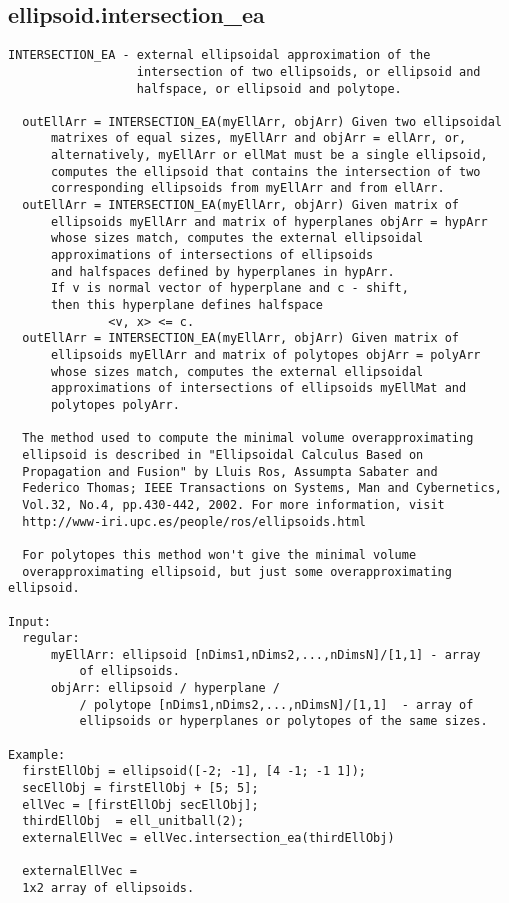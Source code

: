 \subsection{\texorpdfstring{ellipsoid.intersection\_ea}{intersection\_ea}}\label{method:ellipsoid.intersectionea}
\begin{verbatim}
INTERSECTION_EA - external ellipsoidal approximation of the
                  intersection of two ellipsoids, or ellipsoid and
                  halfspace, or ellipsoid and polytope.

  outEllArr = INTERSECTION_EA(myEllArr, objArr) Given two ellipsoidal
      matrixes of equal sizes, myEllArr and objArr = ellArr, or,
      alternatively, myEllArr or ellMat must be a single ellipsoid,
      computes the ellipsoid that contains the intersection of two
      corresponding ellipsoids from myEllArr and from ellArr.
  outEllArr = INTERSECTION_EA(myEllArr, objArr) Given matrix of
      ellipsoids myEllArr and matrix of hyperplanes objArr = hypArr
      whose sizes match, computes the external ellipsoidal
      approximations of intersections of ellipsoids
      and halfspaces defined by hyperplanes in hypArr.
      If v is normal vector of hyperplane and c - shift,
      then this hyperplane defines halfspace
              <v, x> <= c.
  outEllArr = INTERSECTION_EA(myEllArr, objArr) Given matrix of
      ellipsoids myEllArr and matrix of polytopes objArr = polyArr
      whose sizes match, computes the external ellipsoidal
      approximations of intersections of ellipsoids myEllMat and
      polytopes polyArr.

  The method used to compute the minimal volume overapproximating
  ellipsoid is described in "Ellipsoidal Calculus Based on
  Propagation and Fusion" by Lluis Ros, Assumpta Sabater and
  Federico Thomas; IEEE Transactions on Systems, Man and Cybernetics,
  Vol.32, No.4, pp.430-442, 2002. For more information, visit
  http://www-iri.upc.es/people/ros/ellipsoids.html

  For polytopes this method won't give the minimal volume
  overapproximating ellipsoid, but just some overapproximating ellipsoid.

Input:
  regular:
      myEllArr: ellipsoid [nDims1,nDims2,...,nDimsN]/[1,1] - array
          of ellipsoids.
      objArr: ellipsoid / hyperplane /
          / polytope [nDims1,nDims2,...,nDimsN]/[1,1]  - array of
          ellipsoids or hyperplanes or polytopes of the same sizes.

Example:
  firstEllObj = ellipsoid([-2; -1], [4 -1; -1 1]);
  secEllObj = firstEllObj + [5; 5];
  ellVec = [firstEllObj secEllObj];
  thirdEllObj  = ell_unitball(2);
  externalEllVec = ellVec.intersection_ea(thirdEllObj)

  externalEllVec =
  1x2 array of ellipsoids.
\end{verbatim}
